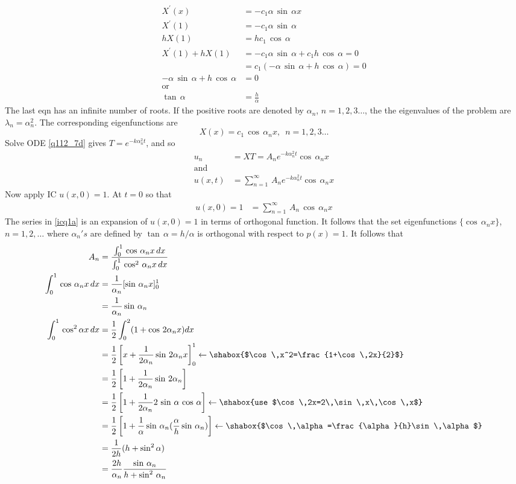 \begin{align*}
X^{'}(x)&=-c_1\alpha\,\sin\,\alpha x\\
X^{'}(1)&=-c_1\alpha\,\sin\,\alpha\\
hX(1)&=hc_1\,\cos\,\alpha\\
X^{'}(1)+hX(1)&=-c_1\alpha\,\sin\,\alpha+c_1 h\,\cos\,\alpha=0\\ 
&=c_1(-\alpha\,\sin\,\alpha+h\,\cos\,\alpha)=0\\
-\alpha\,\sin\,\alpha+h\,\cos\,\alpha&=0\\
\text{or}\,\,&\\
\tan\,\alpha&=\frac{h}{\alpha}
\end{align*}
The last eqn has an infinite number of roots. If the positive roots are denoted by $\alpha_n$, $n=1,2,3\ldots$, the the eigenvalues of the problem are $\lambda_n=\alpha^2_n$. The corresponding eigenfunctions are
\begin{equation}
X(x)=c_1\,\cos\,\alpha_n x,\,\,\,n=1,2,3\ldots
\end{equation}
Solve ODE \eqref{q112_7d} gives $T=e^{-k\alpha^2_n t}$, and so
\begin{align}
u_n&=XT=A_ne^{-k\alpha^2_nt}\cos\,\alpha_n x\nonumber\\
\text{and}\,\,&\nonumber\\
u(x,t)&=\sum_{n=1}^\infty\,A_ne^{-k\alpha^2_nt}\cos\,\alpha_n x\label{soee}
\end{align}
Now apply IC $u(x,0)=1$. At $t=0$ so that
\begin{align}
u(x,0)=1&=\sum_{n=1}^\infty
\,A_n\,\cos\,\alpha_n x\label{icq1a}
\end{align}
The series in \eqref{icq1a} is an expansion of $u(x,0)=1$  in terms of orthogonal function.
It follows that the set eigenfunctions $\{\cos\,\alpha_n x\}$, $n=1,2,\ldots$ where $\alpha_n's$ are defined by $\tan\,\alpha=h/\alpha$ is orthogonal with respect to $p(x)=1$. It follows that
\begin{align*}
A_n&=\frac{\int_0^1\,\cos\,\alpha_n x\,dx}{\int_0^1\,\cos^2\,\alpha_n x\,dx}\\
\int_0^1\,\cos\,\alpha_n x\,dx&=\frac{1}{\alpha_n}[\sin\,\alpha_nx]_0^1\\
&=\frac{1}{\alpha_n}\sin\,\alpha_n\\
\int_0^1\,\cos^2\alpha x\,dx&=\frac{1}{2}\int_0^2(1+\cos\,2\alpha_n x)dx\\
&=\frac{1}{2}\left[x+\frac{1}{2\alpha_n}\sin\,2\alpha_n x\right]_0^1\leftarrow\shabox{$\cos\,x^2=\frac{1+\cos\,2x}{2}$}\\
&=\frac{1}{2}\left[1+\frac{1}{2\alpha_n}\sin\,2\alpha_n\right]\\
&=\frac{1}{2}\left[1+\frac{1}{2\alpha_n}2\,\sin\,\alpha\,\cos\,\alpha\right]\leftarrow\shabox{use $\cos\,2x=2\,\sin\,x\,\cos\,x$}\\
&=\frac{1}{2}\left[1+\frac{1}{\alpha}\sin\,\alpha_n(\frac{\alpha}{h}\sin\,\alpha_n)\right]\leftarrow\shabox{$\cos\,\alpha=\frac{\alpha}{h}\sin\,\alpha$}\\
&=\frac{1}{2h}(h+\sin^2\alpha)\\
&=\frac{2h}{\alpha_n}\frac{\sin\,\alpha_n}{h+\sin^2\,\alpha_n}
\end{align*}

